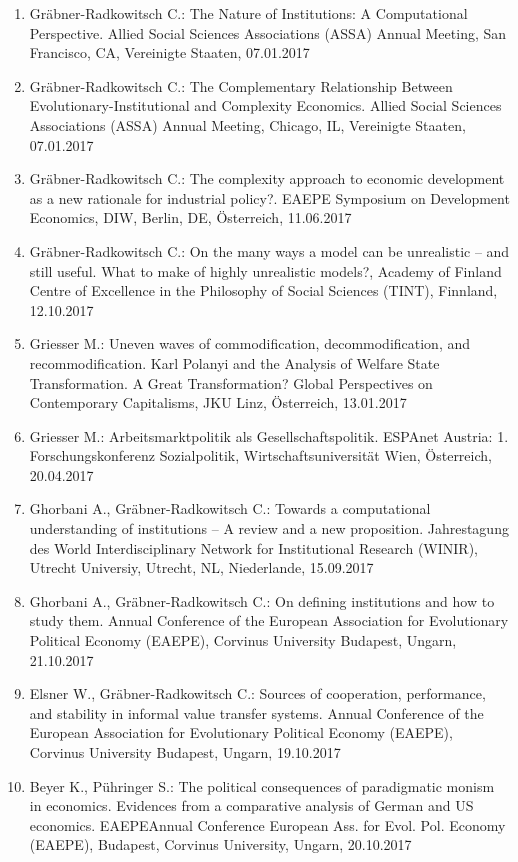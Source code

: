 \begin{enumerate}
	\item Gräbner-Radkowitsch C.: The Nature of Institutions: A Computational Perspective. Allied Social Sciences Associations (ASSA) Annual Meeting, San Francisco, CA, Vereinigte Staaten, 07.01.2017
	\item Gräbner-Radkowitsch C.: The Complementary Relationship Between Evolutionary-Institutional and Complexity Economics. Allied Social Sciences Associations (ASSA) Annual Meeting, Chicago, IL, Vereinigte Staaten, 07.01.2017
	\item Gräbner-Radkowitsch C.: The complexity approach to economic development as a new rationale for industrial policy?. EAEPE Symposium on Development Economics, DIW, Berlin, DE, Österreich, 11.06.2017
	\item Gräbner-Radkowitsch C.: On the many ways a model can be unrealistic – and still useful. What to make of highly unrealistic models?, Academy of Finland Centre of Excellence in the Philosophy of Social Sciences (TINT), Finnland, 12.10.2017
	\item Griesser M.: Uneven waves of commodification, decommodification, and recommodification. Karl Polanyi and the Analysis of Welfare State Transformation. A Great Transformation? Global Perspectives on Contemporary Capitalisms, JKU Linz, Österreich, 13.01.2017
	\item Griesser M.: Arbeitsmarktpolitik als Gesellschaftspolitik. ESPAnet Austria: 1. Forschungskonferenz Sozialpolitik, Wirtschaftsuniversität Wien, Österreich, 20.04.2017
	\item Ghorbani A., Gräbner-Radkowitsch C.: Towards a computational understanding of institutions – A review and a new proposition. Jahrestagung des World Interdisciplinary Network for Institutional Research (WINIR), Utrecht Universiy, Utrecht, NL, Niederlande, 15.09.2017
	\item Ghorbani A., Gräbner-Radkowitsch C.: On defining institutions and how to study them. Annual Conference of the European Association for Evolutionary Political Economy (EAEPE), Corvinus University Budapest, Ungarn, 21.10.2017
	\item Elsner W., Gräbner-Radkowitsch C.: Sources of cooperation, performance, and stability in informal value transfer systems. Annual Conference of the European Association for Evolutionary Political Economy (EAEPE), Corvinus University Budapest, Ungarn, 19.10.2017
	\item Beyer K., Pühringer S.: The political consequences of paradigmatic monism in economics. Evidences from a comparative analysis of German and US economics. EAEPEAnnual Conference European Ass. for Evol. Pol. Economy (EAEPE), Budapest, Corvinus University, Ungarn, 20.10.2017

\end{enumerate}
